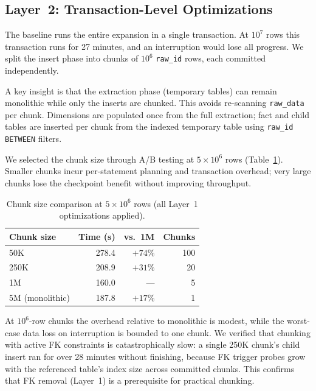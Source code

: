 \documentclass[journal]{IEEEtran}
\begin{document}
\subsection{Layer~2: Transaction-Level Optimizations}
\label{sec:layer2}

The baseline runs the entire expansion in a single transaction.
At $10^7$ rows this transaction runs for 27 minutes, and an interruption would lose all progress.
We split the insert phase into chunks of $10^6$ \texttt{raw\_id} rows, each committed independently.

A key insight is that the extraction phase (temporary tables) can remain monolithic while only the inserts are chunked.
This avoids re-scanning \texttt{raw\_data} per chunk.
Dimensions are populated once from the full extraction; fact and child tables are inserted per chunk from the indexed temporary table using \texttt{raw\_id BETWEEN} filters.

We selected the chunk size through A/B testing at $5 \times 10^6$ rows (Table~\ref{tab:chunking}).
Smaller chunks incur per-statement planning and transaction overhead; very large chunks lose the checkpoint benefit without improving throughput.

\begin{table}[!ht]
\centering
\caption{Chunk size comparison at $5 \times 10^6$ rows (all Layer~1 optimizations applied).}
\label{tab:chunking}
\begin{tabular}{lrrr}
\toprule
\textbf{Chunk size} & \textbf{Time (s)} & \textbf{vs.\ 1M} & \textbf{Chunks} \\
\midrule
50K                  & 278.4 & $+74\%$   & 100 \\
250K                 & 208.9 & $+31\%$   & 20  \\
1M                   & 160.0 & ---       & 5   \\
5M (monolithic)      & 187.8 & $+17\%$   & 1   \\
\bottomrule
\end{tabular}
\end{table}

At $10^6$-row chunks the overhead relative to monolithic is modest, while the worst-case data loss on interruption is bounded to one chunk.
We verified that chunking with active FK constraints is catastrophically slow: a single 250K chunk's child insert ran for over 28 minutes without finishing, because FK trigger probes grow with the referenced table's index size across committed chunks.
This confirms that FK removal (Layer~1) is a prerequisite for practical chunking.
\end{document}
